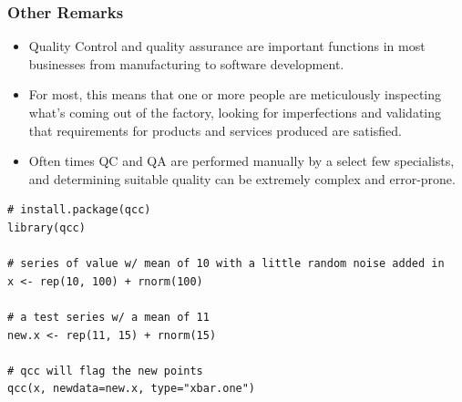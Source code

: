 \documentclass[]{article}
\begin{document}
\subsubsection{Other Remarks}
{\large
\begin{itemize}
\item Quality Control and quality assurance are important functions in most businesses from manufacturing to software development. 
\item For most, this means that one or more people are meticulously inspecting what's coming out of the factory, looking for imperfections and validating that requirements for products and services produced are satisfied. \item Often times QC and QA are performed manually by a select few specialists, and determining suitable quality can be extremely complex and error-prone.
\end{itemize}}
\newpage
{
\large
\begin{framed}
\begin{verbatim}
# install.package(qcc)
library(qcc)
 
# series of value w/ mean of 10 with a little random noise added in
x <- rep(10, 100) + rnorm(100)

# a test series w/ a mean of 11
new.x <- rep(11, 15) + rnorm(15)

# qcc will flag the new points
qcc(x, newdata=new.x, type="xbar.one")
\end{verbatim}
\end{framed}
}
\end{document}
